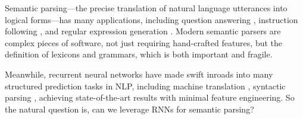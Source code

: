 \documentclass[11pt,letterpaper]{article}
\newcommand\pl[1]{\textcolor{red}{[PL: #1]}}
\newcommand\rj[1]{\textcolor{blue}{[RJ: #1]}}
\begin{document}
Semantic parsing---the precise translation of natural language utterances into 
logical forms---has many applications,
including question answering \cite{zelle96geoquery,zettlemoyer05ccg,zettlemoyer07relaxed,liang11dcs,artzi2013weakly,berant2013freebase},
instruction following \cite{artzi2013weakly},
and regular expression generation \cite{kushman2013regex}.
Modern semantic parsers \cite{artzi2013uw,berant2013freebase} are complex pieces of software,
not just requiring hand-crafted features,
but the definition of lexicons and grammars,
which is both important and fragile.


Meanwhile, recurrent neural networks have made swift inroads into 
many structured prediction tasks in NLP,
including machine translation
\cite{sutskever2014sequence,bahdanau2014neural}, 
syntactic parsing \cite{vinyals2015grammar,dyer2015transition},
achieving state-of-the-art results with minimal feature engineering.
So the natural question is, can we leverage RNNs for semantic parsing?

\end{document}
